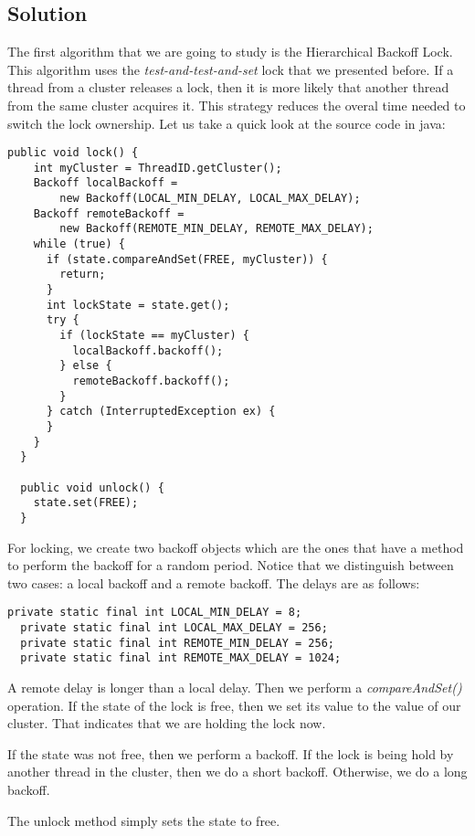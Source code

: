 \subsection{Solution}
\par
The first algorithm that we are going to study is the Hierarchical Backoff Lock.
This algorithm uses the \textit{test-and-test-and-set} lock that we presented
before. If a thread from a cluster releases a lock, then it is more likely that
another thread from the same cluster acquires it. This strategy reduces the
overal time needed to switch the lock ownership. Let us take a quick look at the
source code in java:
\par
\hfill
\begin{lstlisting}[style=numbers]
  public void lock() {
    int myCluster = ThreadID.getCluster();
    Backoff localBackoff =
        new Backoff(LOCAL_MIN_DELAY, LOCAL_MAX_DELAY);
    Backoff remoteBackoff =
        new Backoff(REMOTE_MIN_DELAY, REMOTE_MAX_DELAY);
    while (true) {
      if (state.compareAndSet(FREE, myCluster)) {
        return;
      }   
      int lockState = state.get();
      try {
        if (lockState == myCluster) {
          localBackoff.backoff();
        } else {
          remoteBackoff.backoff();
        }   
      } catch (InterruptedException ex) {
      }   
    }   
  }
  
  public void unlock() {
    state.set(FREE);
  }
\end{lstlisting}
\hfill
\par
For locking, we create two backoff objects which are the ones that have a method to
perform the backoff for a random period. Notice that we distinguish between two
cases: a local backoff and a remote backoff. The delays are as follows:
\par
\hfill
\begin{lstlisting}[style=numbers]
  private static final int LOCAL_MIN_DELAY = 8;
  private static final int LOCAL_MAX_DELAY = 256;
  private static final int REMOTE_MIN_DELAY = 256;
  private static final int REMOTE_MAX_DELAY = 1024;
\end{lstlisting}
\hfill
\par
A remote delay is longer than a local delay. Then we perform a
\textit{compareAndSet()} operation. If the state of the lock is free, then we
set its value to the value of our cluster. That indicates that we are holding
the lock now.
\par
If the state was not free, then we perform a backoff. If the lock is being hold
by another thread in the cluster, then we do a short backoff. Otherwise, we do a
long backoff.
\par
The unlock method simply sets the state to free.
